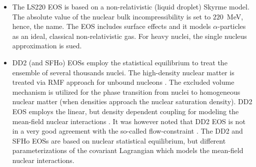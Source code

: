 \begin{itemize}
    \item The LS220 \ac{EOS} is based on a non-relativistic (liquid droplet) Skyrme model.
    The absolute value of the nuclear bulk incompressibility is set to $220$~MeV, hence, the name.
    The \ac{EOS} includes surface effects and it models $\alpha$-particles as an ideal, classical
    non-relativistic gas. For heavy nuclei, the single nucleus approximation is sued. 
    \item DD2 (and SFHo) \acp{EOS} employ the statistical equilibrium to treat the ensemble of several thousands nuclei.
    The high-density nuclear matter is treated via \ac{RMF} approach for unbound nucleons \citep{Hempel:2009mc}.
    The excluded volume mechanism is utilized for the phase transition from nuclei to homogeneous
    nuclear matter (when densities approach the nuclear saturation density).
    DD2 \ac{EOS} employs the linear, but density dependent coupling for modeling the mean-field nuclear interactions \citep{Typel:2009sy}.
    It was however noted that DD2 \ac{EOS} is not in a very good agreement with the so-called 
    flow-constraint \citep{Danielewicz:2002pu}.
    The DD2 and SFHo \acp{EOS} are based on nuclear statistical equilibrium, but 
    different parameterizations of the covariant Lagrangian which models the mean-field nuclear interactions.

\end{itemize}
